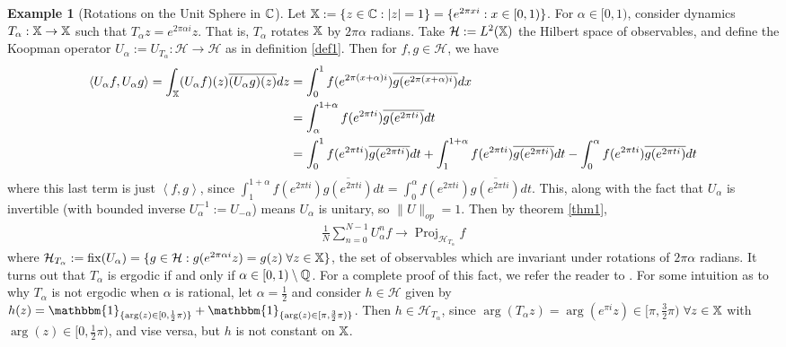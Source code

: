 \documentclass[11pt]{report}
\newcommand{\mc}[1]{\mathcal{#1}}
\newcommand{\ip}[2]{\left\langle#1,#2\right\rangle }
\newcommand{\1}[1]{\mathbbm{1}_{\{#1\}}}
\DeclareMathOperator{\fix}{fix}
\DeclareMathOperator{\proj}{Proj}
\theoremstyle{definition}
\newtheorem{example}{Example}
\begin{document}
    \begin{example}[Rotations on the Unit Sphere in $\mathbb{C}$]
        Let $\mathbb{X}:=\{z\in\mathbb{C}:|z|=1\}=\{e^{2\pi xi}:x\in[0,1)\}$. For
        $\alpha\in[0,1)$, consider dynamics $T_\alpha:\mathbb{X}\rightarrow\mathbb{X}$
        such that $T_\alpha z=e^{2\pi\alpha i}z$. That is, $T_\alpha$ rotates
        $\mathbb{X}$ by $2\pi\alpha$ radians. Take $\mc{H}:=L^2(\mbb{X})$ the
        Hilbert space of observables, and define the Koopman operator
        $U_\alpha:= U_{T_\alpha}:\mc{H}\rightarrow\mc{H}$ as in definition
        \ref{def1}. Then for $f,g\in\mc{H}$, we have
        \begin{align*}
            \ip{U_\alpha f}{U_\alpha g}=\int_\mbb{X}(U_\alpha f)(z)\overline{(U_\alpha g)(z)}dz&=\int_0^1f(e^{2\pi(x+\alpha)i})\overline{g(e^{2\pi(x+\alpha)i})}dx\\
            &=\int_\alpha^{1+\alpha}f(e^{2\pi ti})\overline{g(e^{2\pi ti})}dt\\
            &=\int_{0}^{1}f(e^{2\pi ti})\overline{g(e^{2\pi ti})}dt+\int_{1}^{1+\alpha}f(e^{2\pi ti})\overline{g(e^{2\pi ti})}dt-\int_{0}^\alpha f(e^{2\pi ti})\overline{g(e^{2\pi ti})}dt
        \end{align*}
        where this last term is just $\ip{f}{g}$, since
        $\int_{1}^{1+\alpha}f(e^{2\pi ti})\overline{g(e^{2\pi
        ti})}dt=\int_{0}^\alpha f(e^{2\pi ti})\overline{g(e^{2\pi ti})}dt$.
        This, along with the fact that $U_\alpha$ is invertible (with bounded
        inverse $U^{-1}_\alpha:=U_{-\alpha}$) means $U_\alpha$ is unitary, so
        $\|U\|_{op}=1$. Then by theorem \ref{thm1},
        \begin{align*}
            \frac{1}{N}\sum_{n=0}^{N-1}U^n_\alpha f\longrightarrow\proj_{\mc{H}_{T_\alpha}}f
        \end{align*}
        where $\mc{H}_{T_\alpha}:=\fix(U_\alpha)=\{g\in\mc{H}:g(e^{2\pi\alpha
        i}z)=g(z)\;\forall z\in\mbb{X}\}$, the set of observables which are
        invariant under rotations of $2\pi\alpha$ radians. It turns out that
        $T_\alpha$ is ergodic if and only if $\alpha\in[0,1)\setminus\mathbb{Q}$.
        For a complete proof of this fact, we refer the reader to
        \cite[proposition 7.15]{Eisner_Farkas_Haase_Nagel_2015}. For some
        intuition as to why $T_\alpha$ is not ergodic when $\alpha$ is rational,
        let $\alpha=\frac{1}{2}$ and consider $h\in\mc{H}$ given by
        $h(z)=\1{\arg(z)\in[0,\frac{1}{2}\pi)}+\1{\arg(z)\in[\pi,\frac{3}{2}\pi)}$.
        Then $h\in\mc{H}_{T_\alpha}$, since $\arg(T_\alpha z)=\arg(e^{\pi
        i}z)\in[\pi,\frac{3}{2}\pi)$ $\forall z\in\mathbb{X}$ with
        $\arg(z)\in[0,\frac{1}{2}\pi)$, and vise versa, but $h$ is not constant
        on $\mathbb{X}$.
    \end{example}
\end{document}
